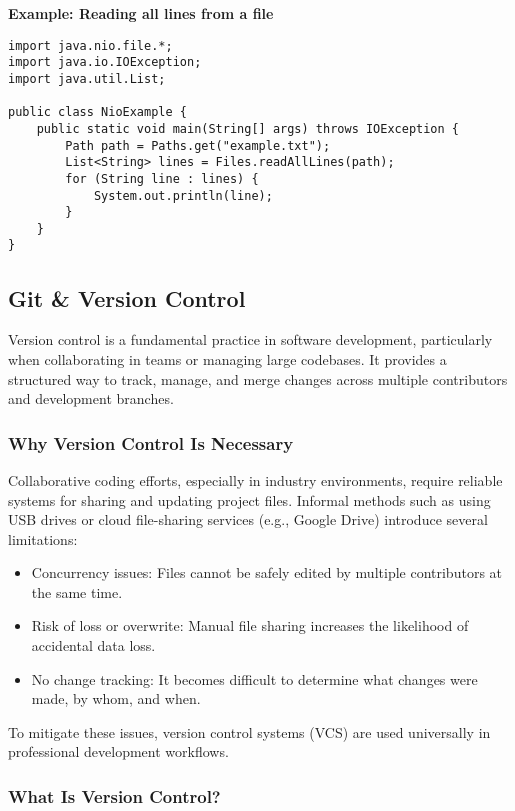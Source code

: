 \documentclass{article}
\begin{document}
\noindent\textbf{Example: Reading all lines from a file}
\begin{verbatim}
import java.nio.file.*;
import java.io.IOException;
import java.util.List;

public class NioExample {
    public static void main(String[] args) throws IOException {
        Path path = Paths.get("example.txt");
        List<String> lines = Files.readAllLines(path);
        for (String line : lines) {
            System.out.println(line);
        }
    }
}
\end{verbatim}

\subsection{Git \& Version Control}

Version control is a fundamental practice in software development, particularly when collaborating in teams or managing large codebases. It provides a structured way to track, manage, and merge changes across multiple contributors and development branches.

\subsubsection{Why Version Control Is Necessary}

Collaborative coding efforts, especially in industry environments, require reliable systems for sharing and updating project files. Informal methods such as using USB drives or cloud file-sharing services (e.g., Google Drive) introduce several limitations:

\begin{itemize}
    \item Concurrency issues: Files cannot be safely edited by multiple contributors at the same time.
    \item Risk of loss or overwrite: Manual file sharing increases the likelihood of accidental data loss.
    \item No change tracking: It becomes difficult to determine what changes were made, by whom, and when.
\end{itemize}

To mitigate these issues, version control systems (VCS) are used universally in professional development workflows.

\subsubsection{What Is Version Control?}
\end{document}
